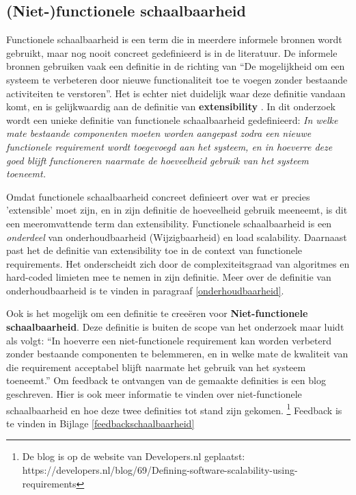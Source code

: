 \subsection{(Niet-)functionele schaalbaarheid} \label{FunctioneleSchaalbaarheid}
Functionele schaalbaarheid is een term die in meerdere informele bronnen wordt gebruikt, maar nog nooit concreet gedefinieerd is in de literatuur. De informele bronnen gebruiken vaak een definitie in de richting van \enquote{De mogelijkheid om een systeem te verbeteren door nieuwe functionaliteit toe te voegen zonder bestaande activiteiten te verstoren}. Het is echter niet duidelijk waar deze definitie vandaan komt, en is gelijkwaardig aan de definitie van \textbf{extensibility} \parencite{Extensibility, DesigningExtensibility}. In dit onderzoek wordt een unieke definitie van functionele schaalbaarheid gedefinieerd: \textit{In welke mate bestaande componenten moeten worden aangepast zodra een nieuwe functionele requirement wordt toegevoegd aan het systeem, en in hoeverre deze goed blijft functioneren naarmate de hoeveelheid gebruik van het systeem toeneemt.} 

Omdat functionele schaalbaarheid concreet definieert over wat er precies 'extensible' moet zijn, en in zijn definitie de hoeveelheid gebruik meeneemt, is dit een meeromvattende term dan extensibility. Functionele schaalbaarheid is een \textit{onderdeel} van onderhoudbaarheid (Wijzigbaarheid) en load scalability. Daarnaast past het de definitie van extensibility toe in de context van functionele requirements. Het onderscheidt zich door de complexiteitsgraad van algoritmes en hard-coded limieten mee te nemen in zijn definitie. Meer over de definitie van onderhoudbaarheid is te vinden in paragraaf \ref{onderhoudbaarheid}.

Ook is het mogelijk om een definitie te creeëren voor \textbf{Niet-functionele schaalbaarheid}. Deze definitie is buiten de scope van het onderzoek maar luidt als volgt:
\enquote{In hoeverre een niet-functionele requirement kan worden verbeterd zonder bestaande componenten te belemmeren, en in welke mate de kwaliteit van die requirement acceptabel blijft naarmate het gebruik van het systeem toeneemt.} Om feedback te ontvangen van de gemaakte definities is een blog geschreven. Hier is ook meer informatie te vinden over niet-functionele schaalbaarheid en hoe deze twee definities tot stand zijn gekomen. \footnote{De blog is op de website van Developers.nl geplaatst:\\ https://developers.nl/blog/69/Defining-software-scalability-using-requirements} Feedback is te vinden in Bijlage \ref{feedbackschaalbaarheid}

